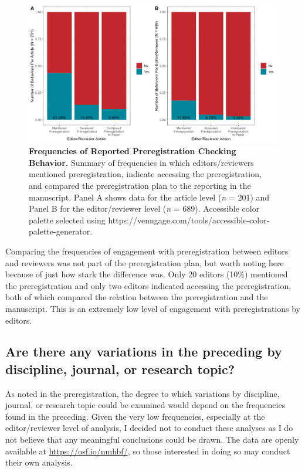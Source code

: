 \documentclass[authordate, empirical]{jote-new-article}
\begin{document}
	\begin{figure}
		\includegraphics[width=\linewidth]{media/image2.png}

		\caption{\textbf{Frequencies of Reported Preregistration Checking Behavior.}\emph{ }Summary of frequencies in which editors/reviewers mentioned preregistration, indicate accessing the preregistration, and compared the preregistration plan to the reporting in the manuscript. Panel A shows data for the article level (\emph{n} = 201) and Panel B for the editor/reviewer level (\emph{n} = 689). Accessible color palette selected using https://venngage.com/tools/accessible-color-palette-generator.}

		\label{fig:rId11}


	\end{figure}


	Comparing the frequencies of engagement with preregistration between editors and reviewers was not part of the preregistration plan, but worth noting here because of just how stark the difference was. Only 20 editors (10\%) mentioned the preregistration and only two editors indicated accessing the preregistration, both of which compared the relation between the preregistration and the manuscript. This is an extremely low level of engagement with preregistrations by editors.



	\subsection{Are there any variations in the preceding by discipline, journal, or research topic?}



	As noted in the preregistration, the degree to which variations by discipline, journal, or research topic could be examined would depend on the frequencies found in the preceding. Given the very low frequencies, especially at the editor/reviewer level of analysis, I decided not to conduct these analyses as I do not believe that any meaningful conclusions could be drawn. The data are openly available at \url{https://osf.io/nmhbf/}, so those interested in doing so may conduct their own analysis.
\end{document}
